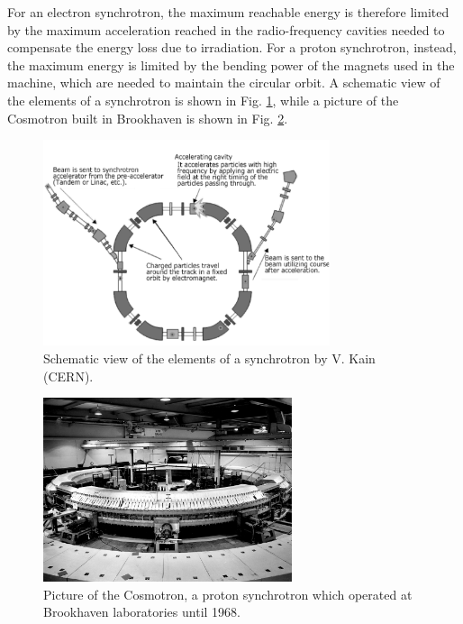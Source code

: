 For an electron synchrotron, the maximum reachable energy is therefore limited by the maximum acceleration reached in the radio-frequency cavities needed to compensate the energy loss due to irradiation. For a proton synchrotron, instead, the maximum energy is limited by the bending power of the magnets used in the machine, which are needed to maintain the circular orbit. A schematic view of the elements of a synchrotron is shown in Fig. \ref{fig:Synchrotron}, while a picture of the Cosmotron built in Brookhaven is shown in Fig. \ref{fig:Cosmotron}.

\begin{figure}[h]
    \centering
    \includegraphics[width=0.75\textwidth]{Figures/Synchrotron}
    \caption{Schematic view of the elements of a synchrotron by V. Kain (CERN).}
    \label{fig:Synchrotron}
\end{figure}
\vspace{3.5cm}
\begin{figure}[h]
    \centering
    \includegraphics[width=0.65\textwidth]{Figures/Cosmotron}
    \caption{Picture of the Cosmotron, a proton synchrotron which operated at Brookhaven laboratories until 1968.}
    \label{fig:Cosmotron}
\end{figure}
